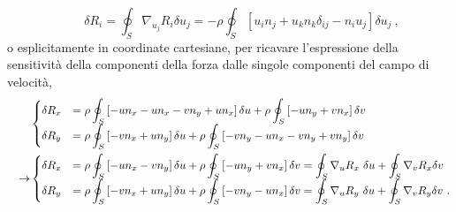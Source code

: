 \begin{equation}
 \qquad \delta R_i = \oint_S \nabla_{u_j} R_i \delta u_j = -\rho \oint_S \left[ u_i n_j + u_k n_k \delta_{ij} - n_i u_j \right] \delta u_j \ ,
\end{equation}
o esplicitamente in coordinate cartesiane, per ricavare l'espressione della sensitività della componenti della forza dalle singole componenti del campo di velocità,
\begin{equation}\label{eqn:sens:cart:simple}
\begin{aligned}
  \qquad & \begin{cases}
  \delta R_x & = \rho \displaystyle\oint_S \left[ -u n_x - u n_x - v n_y + u n_x \right] \delta u + \rho \oint_S \left[ -u n_y + v n_x   \right] \delta v \\
  \delta R_y & = \rho \displaystyle\oint_S \left[ -v n_x + u n_y \right] \delta u + \rho \oint_S \left[ -v n_y - u n_x - v n_y + v n_y \right] \delta v \\
\end{cases}  \vspace{5mm} \\
 \rightarrow & \begin{cases}
 \delta R_x & =
 \rho \displaystyle\oint_S \left[ -u n_x - v n_y \right] \delta u + \rho \oint_S \left[ -u n_y + v n_x   \right] \delta v =
 \oint_S \nabla_{u} R_x \ \delta u + \oint_S \nabla_v R_x \delta v \\
 \delta R_y & = \rho \displaystyle\oint_S \left[ -v n_x + u n_y \right] \delta u + \rho \oint_S \left[ -v n_y - u n_x \right] \delta v =
 \oint_S \nabla_{u} R_y \ \delta u + \oint_S \nabla_v R_y \delta v \ .
\end{cases}
\end{aligned}
\end{equation}

